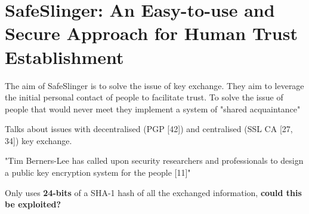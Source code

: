 \section{SafeSlinger: An Easy-to-use and Secure Approach for
Human Trust Establishment}

The aim of SafeSlinger is to solve the issue of key exchange. They aim to leverage the initial personal contact of people to facilitate trust. To solve the issue of people that would never meet they implement a system of "shared acquaintance"

Talks about issues with decentralised (PGP [42]) and centralised (SSL CA [27, 34]) key exchange.

"Tim Berners-Lee has called upon security researchers and professionals to design a public key encryption system for the people [11]"

Only uses \textbf{24-bits} of a SHA-1 hash of all the exchanged information, \textbf{could this be exploited?}

